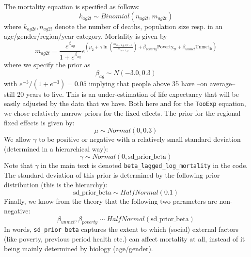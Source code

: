 \documentclass[a4paper,12pt]{article}
\begin{document}
The mortality equation is specified as follows:
\begin{equation}
\label{eq:binom}
k_{ag2t} \sim Binomial(n_{ag2t},m_{ag2t})
\end{equation}
where \(k_{ag2t},n_{ag2t}\) denote the number of deaths, population size resp. in an age/gender/region/year category. Mortality is given by
\begin{equation}
\label{eq:mortalitydist}
m_{ag2t} = \frac{e^{\beta_{ag}}}{1+e^{\beta_{ag}}} e^{\left( \mu_2 + \gamma \ln \left(\frac{m_{a-1,g,2,t-1}}{\bar{m}_{a-1,g}}\right)+ \beta_{poverty}\text{Poverty}_{2t} + \beta_{unmet}\text{Unmet}_{2t}\right)}
\end{equation}
where we specify the prior as
\begin{equation}
\label{eq:7}
\beta_{ag} \sim N(-3.0,0.3)
\end{equation}
with \(e^{-3}/(1+e^{-3}) = 0.05\) implying that people above 35 have --on average-- still 20 years to live. This is an under-estimation of life expectancy that will be easily adjusted by the data that we have. Both here and for the \texttt{TooExp} equation, we chose relatively narrow priors for the fixed effects. The prior for the regional fixed effects is given by:
\begin{equation}
\label{eq:8}
\mu \sim Normal(0,0.3)
\end{equation}
We allow \(\gamma\) to be positive or negative with a relatively small standard deviation (determined in a hierarchical way):
\begin{equation}
\label{eq:9}
\gamma \sim Normal(0,\text{sd\_prior\_beta})
\end{equation}
Note that \(\gamma\) in the main text is denoted \texttt{beta\_lagged\_log\_mortality} in the code. The standard deviation of this prior is determined by the following prior distribution (this is the hierarchy):
\begin{equation}
\label{eq:10}
\text{sd\_prior\_beta} \sim HalfNormal(0.1)
\end{equation}
Finally, we know from the theory that the following two parameters are non-negative:
\begin{equation}
\label{eq:11}
\beta_{unmet}, \beta_{poverty} \sim HalfNormal(\text{sd\_prior\_beta})
\end{equation}
In words, \texttt{sd\_prior\_beta} captures the extent to which (social) external factors (like poverty, previous period health etc.) can affect mortality at all, instead of it being mainly determined by biology (age/gender).
\end{document}

